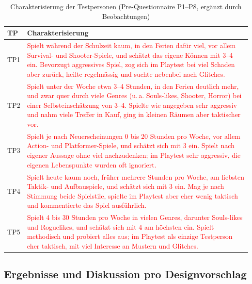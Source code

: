 \documentclass[../Main.tex]{subfiles}
\begin{document}
\begin{table}[H]
    \centering
    \small
    \renewcommand{\arraystretch}{1.3}
    \begin{tabular}{|>{\raggedright\arraybackslash}p{1.2cm}|>{\raggedright\arraybackslash}p{12.6cm}|}
        \hline
        \textbf{TP} & \textbf{Charakterisierung} \\
        \hline
        TP1 & \textcolor{red}{Spielt während der Schulzeit kaum, in den Ferien dafür viel, vor allem Survival- und Shooter-Spiele, und schätzt das eigene Können mit 3--4 ein. Bevorzugt aggressives Spiel, zog sich im Playtest bei viel Schaden aber zurück, heilte regelmässig und suchte nebenbei nach Glitches.} \\
        \hline
        TP2 & \textcolor{red}{Spielt unter der Woche etwa 3--4 Stunden, in den Ferien deutlich mehr, und zwar quer durch viele Genres (u.\,a. Souls-likes, Shooter, Horror) bei einer Selbsteinschätzung von 3--4. Spielte wie angegeben sehr aggressiv und nahm viele Treffer in Kauf, ging in kleinen Räumen aber taktischer vor.} \\
        \hline
        TP3 & \textcolor{red}{Spielt je nach Neuerscheinungen 0 bis 20 Stunden pro Woche, vor allem Action- und Platformer-Spiele, und schätzt sich mit 3 ein. Spielt nach eigener Aussage ohne viel nachzudenken; im Playtest sehr aggressiv, die eigenen Lebenspunkte wurden oft ignoriert.} \\
        \hline
        TP4 & \textcolor{red}{Spielt heute kaum noch, früher mehrere Stunden pro Woche, am liebsten Taktik- und Aufbauspiele, und schätzt sich mit 3 ein. Mag je nach Stimmung beide Spielstile, spielte im Playtest aber eher wenig taktisch und kommentierte das Spiel ausführlich.} \\
        \hline
        TP5 & \textcolor{red}{Spielt 4 bis 30 Stunden pro Woche in vielen Genres, darunter Souls-likes und Roguelikes, und schätzt sich mit 4 am höchsten ein. Spielt methodisch und probiert alles aus; im Playtest als einzige Testperson eher taktisch, mit viel Interesse an Mustern und Glitches.} \\
        \hline
    \end{tabular}
    \caption{Charakterisierung der Testpersonen (Pre-Questionnaire P1--P8, ergänzt durch Beobachtungen)}
    \label{tab:Testpersonen}
\end{table}

\subsection{Ergebnisse und Diskussion pro Designvorschlag} \label{sec:ErgVorschlag} \label{sec:Interpretation}
\end{document}
